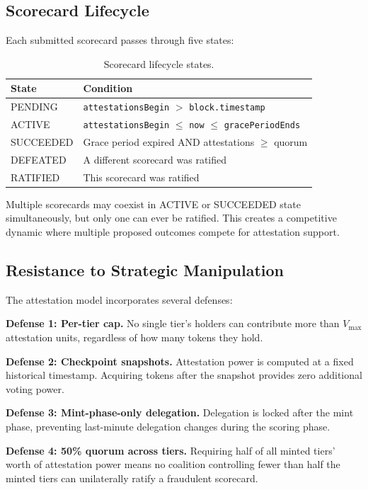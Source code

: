 \documentclass[11pt,a4paper]{article}
\begin{document}
\subsection{Scorecard Lifecycle}

Each submitted scorecard passes through five states:

\begin{table}[H]
\centering
\begin{tabular}{ll}
\toprule
\textbf{State} & \textbf{Condition} \\
\midrule
PENDING & \texttt{attestationsBegin} $>$ \texttt{block.timestamp} \\
ACTIVE & \texttt{attestationsBegin} $\leq$ \texttt{now} $\leq$ \texttt{gracePeriodEnds} \\
SUCCEEDED & Grace period expired AND attestations $\geq$ quorum \\
DEFEATED & A different scorecard was ratified \\
RATIFIED & This scorecard was ratified \\
\bottomrule
\end{tabular}
\caption{Scorecard lifecycle states.}
\end{table}

Multiple scorecards may coexist in ACTIVE or SUCCEEDED state simultaneously, but only one can ever be ratified. This creates a competitive dynamic where multiple proposed outcomes compete for attestation support.

\subsection{Resistance to Strategic Manipulation}

The attestation model incorporates several defenses:

\textbf{Defense 1: Per-tier cap.} No single tier's holders can contribute more than $V_{\max}$ attestation units, regardless of how many tokens they hold.

\textbf{Defense 2: Checkpoint snapshots.} Attestation power is computed at a fixed historical timestamp. Acquiring tokens after the snapshot provides zero additional voting power.

\textbf{Defense 3: Mint-phase-only delegation.} Delegation is locked after the mint phase, preventing last-minute delegation changes during the scoring phase.

\textbf{Defense 4: 50\% quorum across tiers.} Requiring half of all minted tiers' worth of attestation power means no coalition controlling fewer than half the minted tiers can unilaterally ratify a fraudulent scorecard.
\end{document}
